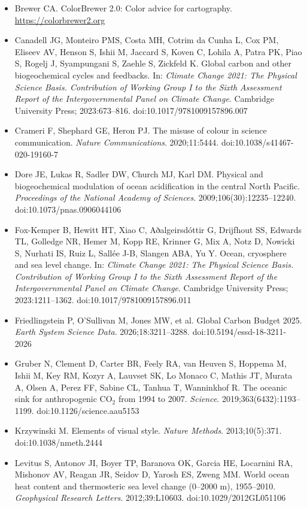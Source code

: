 {\sloppy
\begin{itemize}
\item Brewer CA. ColorBrewer 2.0: Color advice for cartography. \url{https://colorbrewer2.org}
\item Canadell JG, Monteiro PMS, Costa MH, Cotrim da Cunha L, Cox PM, Eliseev AV, Henson S, Ishii M, Jaccard S, Koven C, Lohila A, Patra PK, Piao S, Rogelj J, Syampungani S, Zaehle S, Zickfeld K. Global carbon and other biogeochemical cycles and feedbacks. In: \textit{Climate Change 2021: The Physical Science Basis. Contribution of Working Group I to the Sixth Assessment Report of the Intergovernmental Panel on Climate Change}. Cambridge University Press; 2023:673--816. doi:10.1017/9781009157896.007
\item Crameri F, Shephard GE, Heron PJ. The misuse of colour in science communication. \textit{Nature Communications}. 2020;11:5444. doi:10.1038/s41467-020-19160-7
\item Dore JE, Lukas R, Sadler DW, Church MJ, Karl DM. Physical and biogeochemical modulation of ocean acidification in the central North Pacific. \textit{Proceedings of the National Academy of Sciences}. 2009;106(30):12235--12240. doi:10.1073/pnas.0906044106
\item Fox-Kemper B, Hewitt HT, Xiao C, Aðalgeirsdóttir G, Drijfhout SS, Edwards TL, Golledge NR, Hemer M, Kopp RE, Krinner G, Mix A, Notz D, Nowicki S, Nurhati IS, Ruiz L, Sallée J-B, Slangen ABA, Yu Y. Ocean, cryosphere and sea level change. In: \textit{Climate Change 2021: The Physical Science Basis. Contribution of Working Group I to the Sixth Assessment Report of the Intergovernmental Panel on Climate Change}. Cambridge University Press; 2023:1211--1362. doi:10.1017/9781009157896.011
\item Friedlingstein P, O'Sullivan M, Jones MW, et al. Global Carbon Budget 2025. \textit{Earth System Science Data}. 2026;18:3211--3288. doi:10.5194/essd-18-3211-2026
\item Gruber N, Clement D, Carter BR, Feely RA, van Heuven S, Hoppema M, Ishii M, Key RM, Kozyr A, Lauvset SK, Lo Monaco C, Mathis JT, Murata A, Olsen A, Perez FF, Sabine CL, Tanhua T, Wanninkhof R. The oceanic sink for anthropogenic $\text{CO}_2$ from 1994 to 2007. \textit{Science}. 2019;363(6432):1193--1199. doi:10.1126/science.aau5153
\item Krzywinski M. Elements of visual style. \textit{Nature Methods}. 2013;10(5):371. doi:10.1038/nmeth.2444
\item Levitus S, Antonov JI, Boyer TP, Baranova OK, Garcia HE, Locarnini RA, Mishonov AV, Reagan JR, Seidov D, Yarosh ES, Zweng MM. World ocean heat content and thermosteric sea level change (0--2000 m), 1955--2010. \textit{Geophysical Research Letters}. 2012;39:L10603. doi:10.1029/2012GL051106

\end{itemize}}
